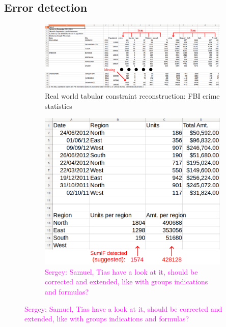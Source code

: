 \documentclass{IEEEtran}
\newcommand{\sergey}[1]{\textcolor{magenta}{{\sc Sergey:} #1}\xspace}
\theoremstyle{definition}
\begin{document}
\subsection{Error detection}
\begin{figure}[thb]
\begin{subfigure}{.70\textwidth}
  \begin{center}
    \includegraphics[width=\textwidth]{figures/fbi_figure_highlighted.png}
  \end{center}
  \caption{Real world tabular constraint reconstruction: FBI crime statistics}
  \label{fig:fbi}
\end{subfigure}
\hfill
\begin{subfigure}{.29\textwidth}
\begin{center}
    \includegraphics[width=\textwidth]{figures/autocompletion_example.png}
  \end{center}
  \caption{\sergey{Samuel, Tias have a look at it, should be corrected and extended, like with groups indications and formulas?}}
  \label{fig:autocompletion_example}

\end{subfigure}

\end{figure}
\end{document}
